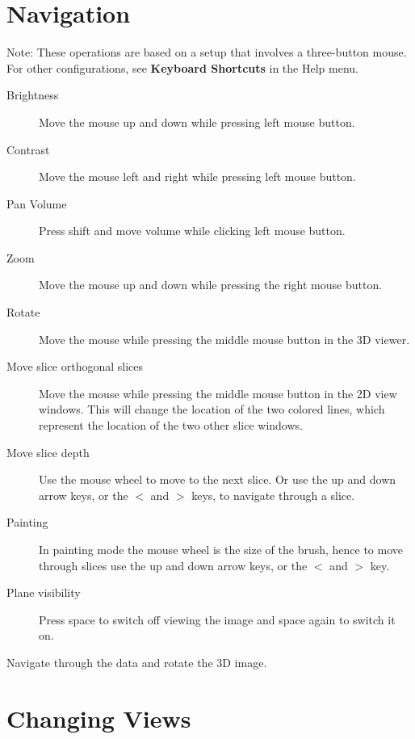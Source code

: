 \documentclass[fleqn,11pt,openany]{book}
\begin{document}
\section{Navigation}
Note: These operations are based on a setup that involves a three-button mouse. For other configurations, see {\bf Keyboard Shortcuts} in the Help menu.
\begin{description}
\item[Brightness] Move the mouse up and down while pressing left mouse button.

\item[Contrast] Move the mouse left and right while pressing left mouse button.

\item[Pan Volume] Press shift and move volume while clicking left mouse button.

\item[Zoom] Move the mouse up and down while pressing the right mouse button.

\item[Rotate] Move the mouse while pressing the middle mouse button in the 3D viewer.

\item[Move slice orthogonal slices] Move the mouse while pressing the middle mouse button in the 2D view windows. This will change the location of the two colored lines, which represent the location of the two other slice windows. 

\item[Move slice depth] Use the mouse wheel to move to the next slice. Or use the up and down arrow keys, or the {\bf $<$} and {\bf $>$} keys, to navigate through a slice.

\item[Painting] In painting mode the mouse wheel is the size of the brush, hence to move through slices use the up and down arrow keys, or the  {\bf $<$} and {\bf  $>$} key. 

\item[Plane visibility] Press space to switch off viewing the image and space again to switch it on.
 
\end{description}

Navigate through the data and rotate the 3D image.

\section{Changing Views}
\end{document}
